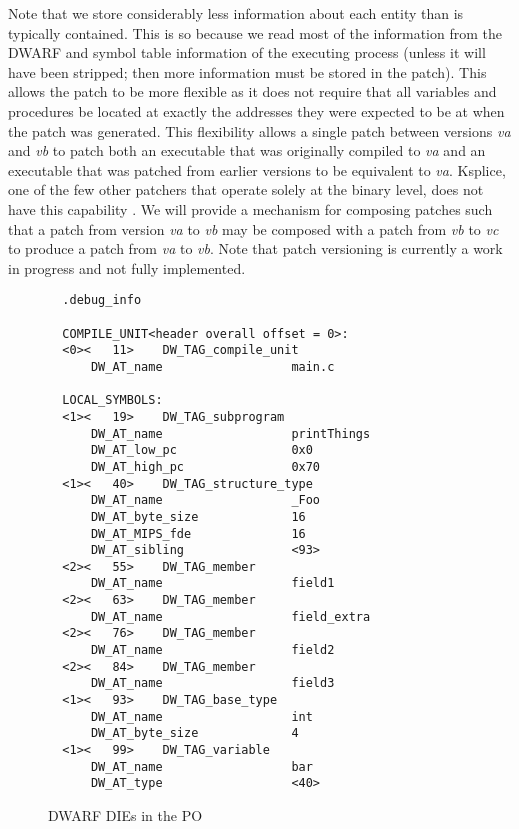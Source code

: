 Note that we store considerably less information about each entity
than is typically contained. This is so because we read most of the
information from the DWARF and symbol table information of the
executing process (unless it will have been stripped; then more
information must be stored in the patch). This allows the patch to be
more flexible as it does not require that all variables and procedures
be located at exactly the addresses they were expected to be at when
the patch was generated. This flexibility allows a single patch
between versions \emph{va} and \emph{vb} to patch both an executable
that was originally compiled to \emph{va} and an executable that was
patched from earlier versions to be equivalent to \emph{va}. Ksplice,
one of the few other patchers that operate solely at the binary
level, does not have this capability \cite{ksplice}. We will provide a
mechanism for composing patches such that a patch from version
\emph{va} to \emph{vb} may be composed with a patch from \emph{vb} to
\emph{vc} to produce a patch from \emph{va} to \emph{vb}. Note that
patch versioning is currently a work in progress and not fully
implemented.
\begin{figure}[ht]
{\small
\begin{center}
\begin{verbatim}
  .debug_info

  COMPILE_UNIT<header overall offset = 0>:
  <0><   11>	DW_TAG_compile_unit
      DW_AT_name                  main.c

  LOCAL_SYMBOLS:
  <1><   19>	DW_TAG_subprogram
      DW_AT_name                  printThings
      DW_AT_low_pc                0x0
      DW_AT_high_pc               0x70
  <1><   40>	DW_TAG_structure_type
      DW_AT_name                  _Foo
      DW_AT_byte_size             16
      DW_AT_MIPS_fde              16
      DW_AT_sibling               <93>
  <2><   55>	DW_TAG_member
      DW_AT_name                  field1
  <2><   63>	DW_TAG_member
      DW_AT_name                  field_extra
  <2><   76>	DW_TAG_member
      DW_AT_name                  field2
  <2><   84>	DW_TAG_member
      DW_AT_name                  field3
  <1><   93>	DW_TAG_base_type
      DW_AT_name                  int
      DW_AT_byte_size             4
  <1><   99>	DW_TAG_variable
      DW_AT_name                  bar
      DW_AT_type                  <40>
\end{verbatim}
\end{center}
}
\caption{DWARF DIEs in the PO}
\label{fig:dies}
\vspace{-10pt}
\end{figure}

